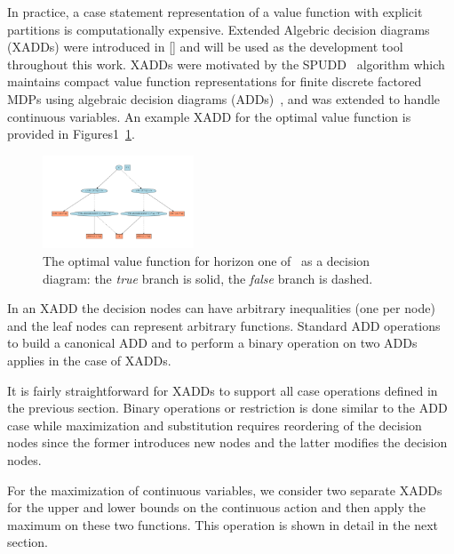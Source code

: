 \documentclass[letterpaper]{article}
\renewcommand{\-}{\text{-}}
\begin{document}
In practice, a case statement representation of a value function with explicit
partitions is computationally expensive.  
Extended Algebric decision diagrams (XADDs) were introduced in [] and will be used 
as the development tool throughout this work. XADDs were motivated by the SPUDD~\cite{spudd} algorithm which
maintains compact value function representations for finite discrete
factored MDPs using algebraic decision diagrams (ADDs)~\cite{bahar93add},
and was extended to handle continuous variables.  An example XADD for the optimal
\InventoryControl value function is provided
in Figures1~\ref{fig:inv_v1}.
\begin{figure}[t]
\begin{center}
\includegraphics[width=0.4\textwidth]{Figures1/inv1.pdf}
\end{center}
\vspace{-3mm}
\caption{%
The optimal value function for horizon one of \InventoryControl\ 
as a decision diagram: 
the \emph{true} branch is solid, the \emph{false}
branch is dashed.} \label{fig:inv_v1}
\vspace{-3mm}
\end{figure}
In an XADD the decision nodes can have arbitrary inequalities (one
per node) and the leaf nodes can represent arbitrary functions.
Standard ADD operations to build a canonical ADD and 
to perform a binary operation on two ADDs applies in the case of XADDs.

It is fairly straightforward for XADDs to support all case operations defined in the previous section. 
Binary operations or restriction is done similar to the ADD case while maximization and substitution 
requires reordering of the decision nodes since the former introduces new nodes and the latter modifies
the decision nodes. 

For the maximization of continuous variables, we consider two separate XADDs for the 
upper and lower bounds on the continuous action and then apply the maximum on these two functions. 
This operation is shown in detail in the next section. 
\end{document}
